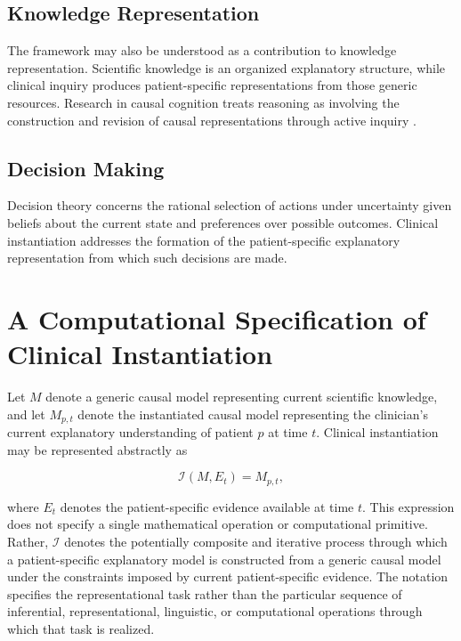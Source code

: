 \documentclass[11pt]{article}
\begin{document}
\subsection{Knowledge Representation}

The framework may also be understood as a contribution to knowledge representation. Scientific knowledge is an organized explanatory structure, while clinical inquiry produces patient-specific representations from those generic resources. Research in causal cognition treats reasoning as involving the construction and revision of causal representations through active inquiry \parencite{gong_active_2023}.

\subsection{Decision Making}

Decision theory concerns the rational selection of actions under uncertainty given beliefs about the current state and preferences over possible outcomes. Clinical instantiation addresses the formation of the patient-specific explanatory representation from which such decisions are made.

\section{A Computational Specification of Clinical Instantiation}

Let $M$ denote a generic causal model representing current scientific knowledge, and let $M_{p,t}$ denote the instantiated causal model representing the clinician's current explanatory understanding of patient $p$ at time $t$. Clinical instantiation may be represented abstractly as

\[
\mathcal{I}(M,E_t)=M_{p,t},
\]

where $E_t$ denotes the patient-specific evidence available at time $t$. This expression does not specify a single mathematical operation or computational primitive. Rather, $\mathcal{I}$ denotes the potentially composite and iterative process through which a patient-specific explanatory model is constructed from a generic causal model under the constraints imposed by current patient-specific evidence. The notation specifies the representational task rather than the particular sequence of inferential, representational, linguistic, or computational operations through which that task is realized.
\end{document}
